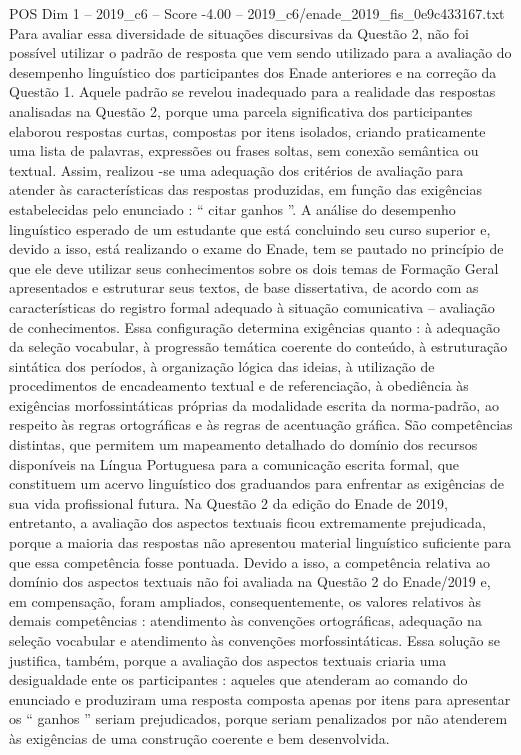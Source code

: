\begin{textsample}{POS Dim 1 – 2019\_c6 – Score -4.00 – 2019\_c6/enade\_2019\_fis\_0e9c433167.txt}
Para avaliar essa diversidade de situações discursivas da Questão 2, não foi possível utilizar o padrão de resposta que vem sendo utilizado para a avaliação do desempenho linguístico dos participantes dos Enade anteriores e na correção da Questão 1.
Aquele padrão se revelou inadequado para a realidade das respostas analisadas na Questão 2, porque uma parcela significativa dos participantes elaborou respostas curtas, compostas por itens isolados, criando praticamente uma lista de palavras, expressões ou frases soltas, sem conexão semântica ou textual.
Assim, realizou -se uma adequação dos critérios de avaliação para atender às características das respostas produzidas, em função das exigências estabelecidas pelo enunciado : “ citar ganhos ”.
A análise do desempenho linguístico esperado de um estudante que está concluindo seu curso superior e, devido a isso, está realizando o exame do Enade, tem se pautado no princípio de que ele deve utilizar seus conhecimentos sobre os dois temas de Formação Geral apresentados e estruturar seus textos, de base dissertativa, de acordo com as características do registro formal adequado à situação comunicativa – avaliação de conhecimentos.
Essa configuração determina exigências quanto : à adequação da seleção vocabular, à progressão temática coerente do conteúdo, à estruturação sintática dos períodos, à organização lógica das ideias, à utilização de procedimentos de encadeamento textual e de referenciação, à obediência às exigências morfossintáticas próprias da modalidade escrita da norma-padrão, ao respeito às regras ortográficas e às regras de acentuação gráfica.
São competências distintas, que permitem um mapeamento detalhado do domínio dos recursos disponíveis na Língua Portuguesa para a comunicação escrita formal, que constituem um acervo linguístico dos graduandos para enfrentar as exigências de sua vida profissional futura.
Na Questão 2 da edição do Enade de 2019, entretanto, a avaliação dos aspectos textuais ficou extremamente prejudicada, porque a maioria das respostas não apresentou material linguístico suficiente para que essa competência fosse pontuada.
Devido a isso, a competência relativa ao domínio dos aspectos textuais não foi avaliada na Questão 2 do Enade/2019 e, em compensação, foram ampliados, consequentemente, os valores relativos às demais competências : atendimento às convenções ortográficas, adequação na seleção vocabular e atendimento às convenções morfossintáticas.
Essa solução se justifica, também, porque a avaliação dos aspectos textuais criaria uma desigualdade ente os participantes : aqueles que atenderam ao comando do enunciado e produziram uma resposta composta apenas por itens para apresentar os “ ganhos ” seriam prejudicados, porque seriam penalizados por não atenderem às exigências de uma construção coerente e bem desenvolvida.

\end{textsample}
